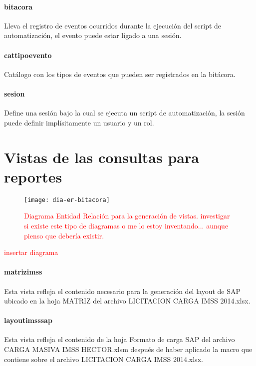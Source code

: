 \paragraph{bitacora\\} Lleva el registro de eventos ocurridos durante la ejecución del script de automatización, el evento puede estar ligado a una sesión.
\paragraph{cat{\textunderscore}tipo{\textunderscore}evento\\} Catálogo con los tipos de eventos que pueden ser registrados en la bitácora.
\paragraph{sesion\\} Define una sesión bajo la cual se ejecuta un script de automatización, la sesión puede definir implísitamente un usuario y un rol.


\section{Vistas de las consultas para reportes}
\begin{figure}[h]
  \centering
  \texttt{[image: dia-er-bitacora]} 
  \caption{\textcolor{red}{Diagrama Entidad Relación para la generación de vistas.
  \newline investigar si existe este tipo de diagramas o me lo estoy inventando... aunque pienso que debería existir.}}
  \label{fig:dia-er-bitacora}
\end{figure}
\textcolor{red}{insertar diagrama}
\paragraph{matriz{\textunderscore}imss} Esta vista refleja el contenido necesario para la generación del layout de SAP ubicado en la hoja MATRIZ del archivo LICITACION  CARGA IMSS 2014.xlsx.

\paragraph{layout{\textunderscore}imss{\textunderscore}sap} Esta vista refleja el contenido de la hoja Formato de carga SAP del archivo CARGA MASIVA IMSS HECTOR.xlsm después de haber aplicado la macro que contiene sobre el archivo LICITACION  CARGA IMSS 2014.xlsx.

